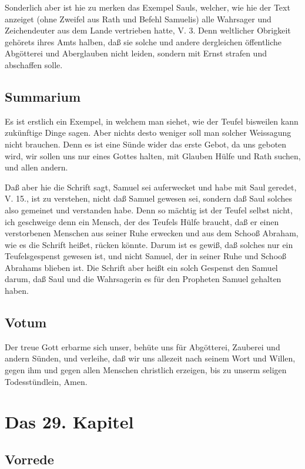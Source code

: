 Sonderlich aber ist hie zu merken das Exempel Sauls, welcher, wie hie der Text anzeiget (ohne Zweifel aus Rath und Befehl Samuelis) alle Wahrsager und Zeichendeuter aus dem Lande vertrieben hatte, V. 3. Denn weltlicher Obrigkeit gehörets ihres Amts halben, daß sie solche und andere dergleichen öffentliche Abgötterei und Aberglauben nicht leiden, sondern mit Ernst strafen und abschaffen solle.

\section{Summarium}

Es ist erstlich ein Exempel, in welchem man siehet, wie der Teufel bisweilen kann zukünftige Dinge sagen. Aber nichts desto weniger soll man solcher Weissagung nicht brauchen. Denn es ist eine Sünde wider das erste Gebot, da uns geboten wird, wir sollen uns nur eines Gottes halten, mit Glauben Hülfe und Rath suchen, und allen andern.

Daß aber hie die Schrift sagt, Samuel sei auferwecket und habe mit Saul geredet, V. 15., ist zu verstehen, nicht daß Samuel gewesen sei, sondern daß Saul solches also gemeinet und verstanden habe. Denn so mächtig ist der Teufel selbst nicht, ich geschweige denn ein Mensch, der des Teufels Hülfe braucht, daß er einen verstorbenen Menschen aus seiner Ruhe erwecken und aus dem Schooß Abraham, wie es die Schrift heißet, rücken könnte. Darum ist es gewiß, daß solches nur ein Teufelsgespenst gewesen ist, und
nicht Samuel, der in seiner Ruhe und Schooß Abrahams blieben ist. Die Schrift aber heißt ein solch Gespenst den Samuel darum, daß Saul und die Wahrsagerin es für den Propheten Samuel gehalten haben.

\section{Votum}

Der treue Gott erbarme sich unser, behüte uns für Abgötterei, Zauberei und andern Sünden, und verleihe, daß wir uns allezeit nach seinem Wort und Willen, gegen ihm und gegen allen Menschen christlich erzeigen, bis zu unserm seligen Todesstündlein, Amen.

\chapter{Das 29. Kapitel}

\section{Vorrede}

